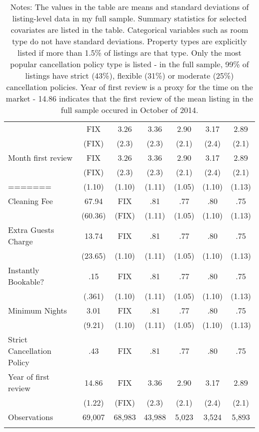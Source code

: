 {\begin{longtable}{l*{6}{c}}
\begin{longtable}{l*{6}{c|c|cccc}}
Year first review    & FIX   &      3.26	&      3.36  &      2.90		&    3.17 		&	 2.89\\
& (FIX)    &     (2.3)         &     (2.3)         &     (2.1)         &     (2.4)         & (2.1)\\
Month first review    & FIX   &      3.26	&      3.36  &      2.90		&    3.17 		&	 2.89\\
& (FIX)    &     (2.3)         &     (2.3)         &     (2.1)         &     (2.4)         & (2.1)\\
=======
         						  &  (1.10)  & (1.10)     &     (1.11)    &     (1.05)         &     (1.10)         &     (1.13)         \\
Cleaning Fee   &  67.94 &      FIX	&      .81&      .77 &      .80  	& 	.75\\
						&  (60.36)  & (FIX)     &     (1.11)         &     (1.05)         &     (1.10)     &     (1.13)         \\
Extra Guests Charge   &   13.74  &  FIX      &    .81  &      .77           &   .80  	& 	.75\\
									&  (23.65)  & (1.10)  &     (1.11) &     (1.05)     &     (1.10) &     (1.13)  \\
Instantly Bookable?   &   .15  &      FIX		&      .81&      .77 &      .80  	& 	.75\\
									&  (.361)  & (1.10)     &     (1.11)  &     (1.05)   &     (1.10)   &     (1.13)         \\
Minimum Nights   &   3.01  &      FIX		&      .81&      .77 &      .80  	& 	.75\\
							&  (9.21)  & (1.10)     &     (1.11)         &     (1.05)         &     (1.10)         &     (1.13)         \\
Strict Cancellation Policy   &   .43  &      FIX		&      .81&      .77 &      .80  	& 	.75\\
[1em]
Year of first review    & 14.86   &      FIX	&      3.36  &      2.90		&    3.17 		&	 2.89\\
							& (1.22)    &     (FIX)         &     (2.3)         &     (2.1)         &     (2.4)         & (2.1)\\


\hline


Observations  & 69,007  & 68,983   &       43,988         &       5,023         &       3,524   & 5,893      \\

\hline\hline
\caption*{Notes: The values in the table are means and standard deviations of listing-level data in my full sample. Summary statistics for selected covariates are listed in the table. Categorical variables such as room type do not have standard deviations. Property types are explicitly listed if more than 1.5\% of listings are that type. Only the most popular cancellation policy type is listed - in the full sample, 99\% of listings have strict (43\%), flexible (31\%) or moderate (25\%) cancellation policies. Year of first review is a proxy for the time on the market - 14.86 indicates that the first review of the mean listing in the full sample occured in October of 2014.}

\end{longtable}
}
\normalsize



